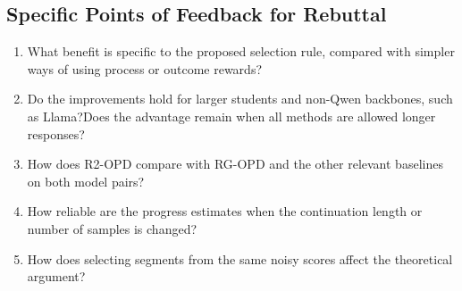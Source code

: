 \subsection*{Specific Points of Feedback for Rebuttal}
\begin{enumerate}
\item What benefit is specific to the proposed selection rule, compared with simpler ways of using process or outcome rewards?
\par{}
\begin{responsebox}[frametitle={Response to Q1}]
\vspace*{2\baselineskip}
\end{responsebox}

\item Do the improvements hold for larger students and non-Qwen backbones, such as Llama?Does the advantage remain when all methods are allowed longer responses?
\par{}
\begin{responsebox}[frametitle={Response to Q2}]
\vspace*{2\baselineskip}
\end{responsebox}

\item How does R2-OPD compare with RG-OPD and the other relevant baselines on both model pairs?
\par{}
\begin{responsebox}[frametitle={Response to Q3}]
\vspace*{2\baselineskip}
\end{responsebox}

\item How reliable are the progress estimates when the continuation length or number of samples is changed?
\par{}
\begin{responsebox}[frametitle={Response to Q4}]
\vspace*{2\baselineskip}
\end{responsebox}

\item How does selecting segments from the same noisy scores affect the theoretical argument?
\par{}
\begin{responsebox}[frametitle={Response to Q5}]
\vspace*{2\baselineskip}
\end{responsebox}

\end{enumerate}

